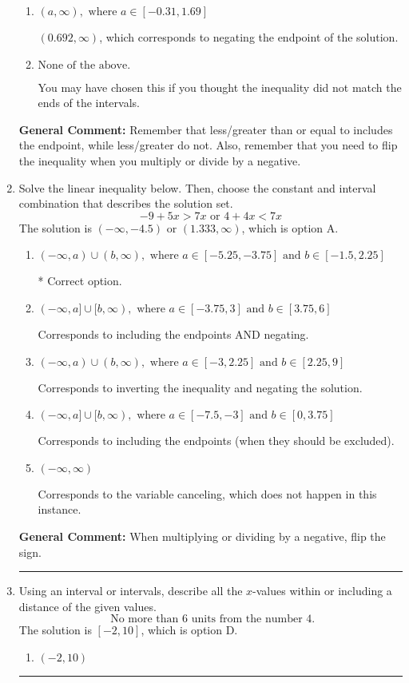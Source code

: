 \documentclass{extbook}[14pt]
\newcommand{\litem}[1]{\item #1

\rule{\textwidth}{0.4pt}}
\begin{document}
\begin{enumerate}
{\begin{enumerate}[label=\Alph*.]
 $(-\infty, -0.692)$, which corresponds to switching the direction of the interval. You likely did this if you did not flip the inequality when dividing by a negative!
\item \( (a, \infty), \text{ where } a \in [-0.31, 1.69] \)

 $(0.692, \infty)$, which corresponds to negating the endpoint of the solution.
\item \( \text{None of the above}. \)

You may have chosen this if you thought the inequality did not match the ends of the intervals.
\end{enumerate}

\textbf{General Comment:} Remember that less/greater than or equal to includes the endpoint, while less/greater do not. Also, remember that you need to flip the inequality when you multiply or divide by a negative.
}
\litem{
Solve the linear inequality below. Then, choose the constant and interval combination that describes the solution set.
\[ -9 + 5 x > 7 x \text{ or } 4 + 4 x < 7 x \]The solution is \( (-\infty, -4.5) \text{ or } (1.333, \infty) \), which is option A.\begin{enumerate}[label=\Alph*.]
\item \( (-\infty, a) \cup (b, \infty), \text{ where } a \in [-5.25, -3.75] \text{ and } b \in [-1.5, 2.25] \)

 * Correct option.
\item \( (-\infty, a] \cup [b, \infty), \text{ where } a \in [-3.75, 3] \text{ and } b \in [3.75, 6] \)

Corresponds to including the endpoints AND negating.
\item \( (-\infty, a) \cup (b, \infty), \text{ where } a \in [-3, 2.25] \text{ and } b \in [2.25, 9] \)

Corresponds to inverting the inequality and negating the solution.
\item \( (-\infty, a] \cup [b, \infty), \text{ where } a \in [-7.5, -3] \text{ and } b \in [0, 3.75] \)

Corresponds to including the endpoints (when they should be excluded).
\item \( (-\infty, \infty) \)

Corresponds to the variable canceling, which does not happen in this instance.
\end{enumerate}

\textbf{General Comment:} When multiplying or dividing by a negative, flip the sign.
}
\litem{
Using an interval or intervals, describe all the $x$-values within or including a distance of the given values.
\[ \text{ No more than } 6 \text{ units from the number } 4. \]The solution is \( [-2, 10] \), which is option D.\begin{enumerate}[label=\Alph*.]
\item \( (-2, 10) \)


\end{enumerate}}
\end{enumerate}
\end{document}
